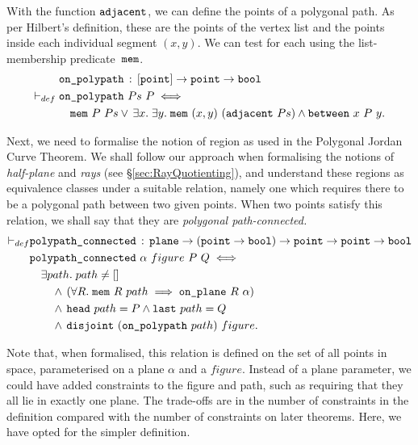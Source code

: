 With the function $\texttt{adjacent}$, we can define the points of a polygonal path. As per Hilbert's definition, these are the points of the vertex list and the points inside each individual segment $(x,y)$. We can test for each using the list-membership predicate~$\texttt{mem}$.
\begin{equation}\label{eq:OnPolyPath}
  \begin{split}
    &\texttt{on\_polypath}\,:\,[\texttt{point}] \rightarrow \texttt{point} \rightarrow \texttt{bool}\\
    \vdash_{def}\;&\texttt{on\_polypath}\ Ps\ P \iff \\
    &\quad\texttt{mem}\ P\ Ps\vee\,\exists x.\;\exists y.\; \texttt{mem}\ (x,y)\ (\texttt{adjacent}\ Ps) \wedge \texttt{between}\ x\ P\ y.
  \end{split}
\end{equation}

Next, we need to formalise the notion of region as used in the Polygonal Jordan Curve Theorem. We shall follow our approach when formalising the notions of \emph{half-plane} and \emph{rays} (see \S\ref{sec:RayQuotienting}), and understand these regions as equivalence classes under a suitable relation, namely one which requires there to be a polygonal path between two given points. When two points satisfy this relation, we shall say that they are \emph{polygonal path-connected.}
\begin{align*}
  \vdash_{def}&\code{polypath\_connected}\,:\,\code{plane}\rightarrow(\code{point} \rightarrow \code{bool}) \rightarrow \code{point} \rightarrow \code{point} \rightarrow \code{bool}\\
  &\code{polypath\_connected}\ \alpha\ figure\ P\ Q \iff\\
  &\quad\exists path.\; path \neq []\\
  &\qquad\wedge\,(\forall R.\;\code{mem}\ R\ path \implies \onplane{R}{\alpha})\\
  &\qquad\wedge\,\code{head}\ path = P \wedge \code{last}\ path = Q\\
  &\qquad\wedge\,\code{disjoint}\ (\code{on\_polypath}\ path)\ figure.
\end{align*}

Note that, when formalised, this relation is defined on the set of all points in space, parameterised on a plane $\alpha$ and a $figure$. Instead of a plane parameter, we could have added constraints to the figure and path, such as requiring that they all lie in exactly one plane. The trade-offs are in the number of constraints in the definition compared with the number of constraints on later theorems. Here, we have opted for the simpler definition.

